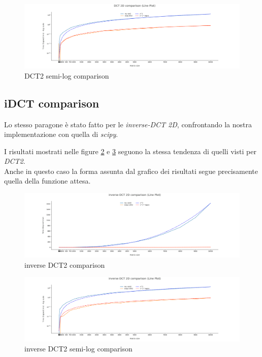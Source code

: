 \begin{figure}[H]
\hspace*{-2cm} \includegraphics[scale=0.4]{figs/DCT Comparison/dct2_log_comparison.png}
    \caption{DCT2 semi-log comparison}
    \label{fig:dct2_log_comparison}
\end{figure}

\subsection{iDCT comparison}

Lo stesso paragone è stato fatto per le \textit{inverse-DCT 2D}, confrontando la nostra implementazione con quella di \textit{scipy}.

I risultati mostrati nelle figure \ref{fig:idct2_comparison} e \ref{fig:idct2_log_comparison} seguono la stessa tendenza di quelli visti per \textit{DCT2}.\\
Anche in questo caso la forma assunta dal grafico dei risultati segue precisamente quella della funzione attesa.

\begin{figure}[H]
\hspace*{-2cm} \includegraphics[scale=0.4]{figs/DCT Comparison/idct2_comparison.png}
    \caption{inverse DCT2 comparison}
    \label{fig:idct2_comparison}
\end{figure}

\begin{figure}[H]
\hspace*{-2cm} \includegraphics[scale=0.4]{figs/DCT Comparison/idct2_log_comparison.png}
    \caption{inverse DCT2 semi-log comparison}
    \label{fig:idct2_log_comparison}
\end{figure}

